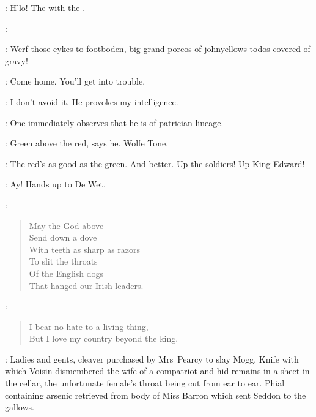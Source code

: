 \KevinEgan:
H'lo!
The  with the .


\Patrice:

\DonEmile:
Werf those eykes to footboden, big grand
porcos of johnyellows todos covered of gravy!

\Bloom:
Come home.
You'll get into trouble.

\Stephen:
I don't avoid it.
He provokes my intelligence.

\BiddyClap:
One immediately observes that he is of patrician lineage.

\Virago:
Green above the red, says he.
Wolfe Tone.

\Bawd:
The red's as good as the green.
And better.
Up the soldiers!
Up King Edward!%

\ARough:
Ay! Hands up to De Wet.

\Citizen:
\begin{verse}
    May the God above\\
    Send down a dove\\
    With teeth as sharp as razors\\
    To slit the throats\\
    Of the English dogs\\
%
    That hanged our Irish leaders.
\end{verse}


\CroppyBoy:
\begin{verse}
    I bear no hate to a living thing,\\
    But I love my country beyond the king.
\end{verse}


\RumboldDemonBarber:
Ladies and gents, cleaver purchased by Mrs~Pearcy to slay Mogg.
Knife with which Voisin dismembered the wife of a compatriot
and hid remains in a sheet in the cellar,
the unfortunate female's throat being cut from ear to ear.
Phial containing arsenic retrieved from body of Miss Barron
which sent Seddon to the gallows.

